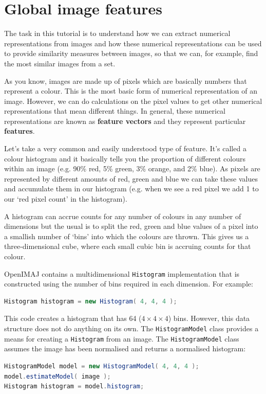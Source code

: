 \chapter{Global image features}
The task in this tutorial is to understand how we can extract numerical representations from images 
and how these numerical representations can be used to provide similarity measures between images, 
so that we can, for example, find the most similar images from a set.

As you know, images are made up of pixels which are basically numbers that represent a colour. 
This is the most basic form of numerical representation of an image. However, we can do calculations 
on the pixel values to get other numerical representations that mean different things. In general, 
these numerical representations are known as \textbf{feature vectors} and they represent particular 
\textbf{features}.

Let's take a very common and easily understood type of feature. It's called a colour histogram and 
it basically tells you the proportion of different colours within an image (e.g. 90\% red, 5\% green, 
3\% orange, and 2\% blue). As pixels are represented by different amounts of red, green and blue we 
can take these values and accumulate them in our histogram (e.g. when we see a red pixel we add 1 
to our `red pixel count' in the histogram). 

A histogram can accrue counts for any number of colours in any number of dimensions but the usual 
is to split the red, green and blue values of a pixel into a smallish number of `bins' into which the 
colours are thrown.  This gives us a three-dimensional cube, where each small cubic bin is accruing 
counts for that colour.

OpenIMAJ contains a multidimensional \verb+Histogram+ implementation that is constructed using the number 
of bins required in each dimension. For example:
\begin{lstlisting}[language=java]
Histogram histogram = new Histogram( 4, 4, 4 );
\end{lstlisting}
This code creates a histogram that has 64 ($4\times4\times4$) bins. However, this data structure does not do 
anything on its own. The \verb+HistogramModel+ class provides a means for creating a \verb+Histogram+ 
from an image.  The \verb+HistogramModel+ class assumes the image has been normalised and returns a normalised histogram:
\begin{lstlisting}[language=java]
HistogramModel model = new HistogramModel( 4, 4, 4 );
model.estimateModel( image );
Histogram histogram = model.histogram;
\end{lstlisting}

